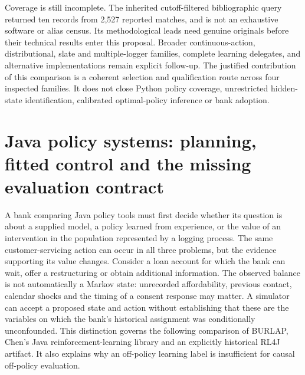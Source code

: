 Coverage is still incomplete. The inherited cutoff-filtered bibliographic query
returned ten records from 2,527 reported matches, and is not an exhaustive software
or alias census. Its methodological leads need genuine originals before their
technical results enter this proposal. Broader continuous-action, distributional,
slate and multiple-logger families, complete learning delegates, and alternative
implementations remain explicit follow-up. The justified contribution of this
comparison is a coherent selection and qualification route across four inspected
families. It does not close Python policy coverage, unrestricted hidden-state
identification, calibrated optimal-policy inference or bank adoption.
\citep{exec24_policiespython_comparison}


\section{Java policy systems: planning, fitted control and the missing evaluation contract}
\label{sec:exec24-policies-java}
A bank comparing Java policy tools must first decide whether its question is about a supplied model, a policy learned from experience, or the value of an intervention in the population represented by a logging process. The same customer-servicing action can occur in all three problems, but the evidence supporting its value changes. Consider a loan account for which the bank can wait, offer a restructuring or obtain additional information. The observed balance is not automatically a Markov state: unrecorded affordability, previous contact, calendar shocks and the timing of a consent response may matter. A simulator can accept a proposed state and action without establishing that these are the variables on which the bank's historical assignment was conditionally unconfounded. This distinction governs the following comparison of BURLAP, Chen's Java reinforcement-learning library and an explicitly historical RL4J artifact. It also explains why an off-policy learning label is insufficient for causal off-policy evaluation.~\citep{exec24_policyjava_burlap,exec24_policyjava_chen,exec24_policyjava_rl4j,exec24_policyjava_comparison}


